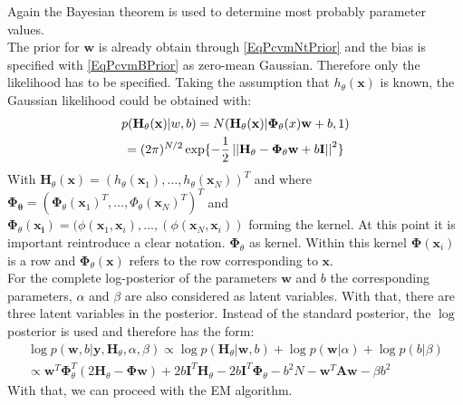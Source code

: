 Again the Bayesian theorem is used to determine most probably parameter values.\cite{Chen.2009}\\
The prior for $\mathbf{w}$ is already obtain through \ref{EqPcvmNtPrior} and the bias is specified with \eqref{EqPcvmBPrior} as zero-mean Gaussian. Therefore only the likelihood has to be specified.
Taking the assumption that $h_\theta (\mathbf{x})$ is known, the Gaussian likelihood could be obtained with:\cite{Chen.2009}
\begin{equation}\label{EqPcGausLike}
\begin{gathered}
p(\mathbf{H}_\theta(\mathbf{x})\vert w,b) = N(\mathbf{H}_\theta(\mathbf{x})\vert \mathbf{\Phi}_\theta(x)\mathbf{w}+b,1)\\
= (2\pi)^{N/2}\exp\{-\frac{1}{2} \left\vert\left\vert\mathbf{H}_{\theta} - \mathbf{\Phi}_{\theta}\mathbf{w}+b\mathbf{I}\right\vert\right\vert^2 \}
\end{gathered}
\end{equation}
With $\mathbf{H}_\theta(\mathbf{x}) = (h_\theta(\mathbf{x}_1),\dots,h_\theta(\mathbf{x}_N))^T$ and where $\mathbf{\Phi_\theta} = (\mathbf{\Phi}_\theta(\mathbf{x}_1)^T,\dots,\Phi_\theta(\mathbf{x}_N)^T)^T$ and $\mathbf{\Phi}_\theta(\mathbf{x_i}) = (\phi(\mathbf{x}_1,\mathbf{x}_i),\dots,(\phi(\mathbf{x}_N,\mathbf{x}_i))$ forming the kernel.
At this point it is important reintroduce a clear notation.
$\mathbf{\Phi}_\theta$ as kernel. Within this kernel $\mathbf{\Phi}(\mathbf{x}_i)$ is a row and $\mathbf{\Phi}_\theta(\mathbf{x})$ refers to the row corresponding to $\mathbf{x}$.\\
For the complete log-posterior of the parameters $\mathbf{w}$ and $b$ the corresponding parameters, $\alpha$ and $\beta$ are also considered as latent variables.
With that, there are three latent variables in the posterior.
Instead of the standard posterior, the $\log$ posterior is used and therefore has the form:\cite{Chen.2009}
\begin{equation}\label{EqPcvmInf}
\begin{gathered}
\log p(\mathbf{w},b\vert \mathbf{y},\mathbf{H}_\theta,\alpha,\beta) \propto \log p(\mathbf{H}_\theta \vert \mathbf{w},b) + \log p(\mathbf{w}\vert \alpha) + \log p(b\vert \beta)\\
\propto \mathbf{w}^T\mathbf{\Phi}_\theta^T(2\mathbf{H}_\theta - \mathbf{\Phi}\mathbf{w})+2b\mathbf{I}^T\mathbf{H}_\theta - 2b\mathbf{I}^T\mathbf{\Phi}_\theta - b^2N - \mathbf{w}^T\mathbf{Aw}-\beta b^2
\end{gathered}
\end{equation}
With that, we can proceed with the \acs{EM} algorithm.\cite{Chen.2009}\\
